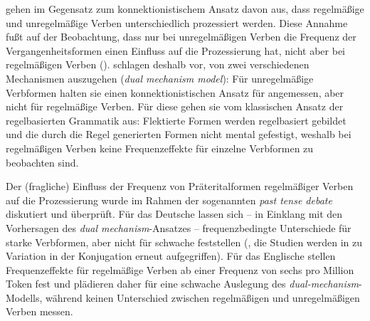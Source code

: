 \textcite{Pinker.1991} gehen im Gegensatz zum konnektionistischem Ansatz davon aus, dass regelmäßige und unregelmäßige Verben unterschiedlich prozessiert werden. Diese Annahme fußt auf der Beobachtung, dass nur bei unregelmäßigen Verben die Frequenz der Vergangenheitsformen einen Einfluss auf die Prozessierung hat, nicht aber bei regelmäßigen Verben (\cite[232--233]{Pinker.1991}). \textcite[233--234]{Pinker.1991} schlagen deshalb vor, von zwei verschiedenen Mechanismen auszugehen (\textit{dual mechanism model}): Für unregelmäßige Verbformen halten sie einen konnektionistischen Ansatz für angemessen, aber nicht für regelmäßige Verben. Für diese gehen sie vom klassischen Ansatz der regelbasierten Grammatik aus: Flektierte Formen werden regelbasiert gebildet und die durch die Regel generierten Formen nicht mental gefestigt, weshalb bei regelmäßigen Verben keine Frequenzeffekte für einzelne Verbformen zu beobachten sind. 

Der (fragliche) Einfluss der Frequenz von Präteritalformen regelmäßiger Verben auf die Prozessierung wurde im Rahmen der sogenannten \textit{past tense debate} diskutiert und überprüft. Für das Deutsche lassen sich -- in Einklang mit den Vorhersagen des \textit{dual mechanism}-Ansatzes -- frequenzbedingte Unterschiede für starke Verbformen, aber nicht für schwache feststellen (\cite{Clahsen.1997, Clahsen.2001, Clahsen.2004}, die Studien werden in  zu Variation in der Konjugation erneut aufgegriffen). Für das Englische stellen  \textcite{Alegre.1999}  Frequenzeffekte für regelmäßige Verben ab einer Frequenz von sechs pro Million Token fest und plädieren daher für eine schwache Auslegung des \textit{dual-mechanism}-Modells, während \textcite{Hare.2001} keinen Unterschied zwischen regelmäßigen und unregelmäßigen Verben messen.  

